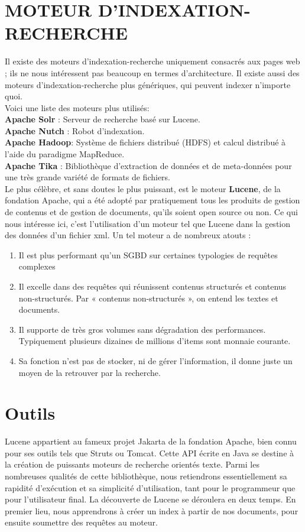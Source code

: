 \documentclass[12pt]{report}
\begin{document}
\section{MOTEUR D’INDEXATION-RECHERCHE}
Il existe des moteurs d’indexation-recherche uniquement consacrés aux pages web ; ils ne nous intéressent pas beaucoup en termes d’architecture. 
Il existe aussi des moteurs d’indexation-recherche plus génériques, qui peuvent indexer n’importe quoi.\\
Voici une liste des  moteurs plus utilisés:\\
\textbf{Apache Solr} : Serveur de recherche basé sur Lucene.\\
\textbf{Apache Nutch} : Robot d'indexation.\\
\textbf{Apache Hadoop}: Système de fichiers distribué (HDFS) et calcul distribué à l'aide du paradigme MapReduce.\\
\textbf{Apache Tika} : Bibliothèque d'extraction de données et de meta-données pour une très grande variété de formats de fichiers.\\
Le plus célèbre, et sans doutes le plus puissant, est le moteur \textbf{Lucene}, de la fondation Apache, qui a été adopté par pratiquement tous les produits de gestion de contenus et de gestion de documents, qu’ils soient open source ou non. 
Ce qui nous intéresse ici, c’est l’utilisation d’un moteur tel que Lucene dans la gestion des données d'un fichier xml. Un tel moteur a de nombreux atouts :
\begin{enumerate}
\item
Il est plus performant qu’un SGBD sur certaines typologies de requêtes complexes 
\item
Il excelle dans des requêtes qui réunissent contenus structurés et contenus non-structurés. Par « contenus non-structurés », on entend les textes et documents.
\item
Il supporte de très gros volumes sans dégradation des performances. Typiquement plusieurs dizaines de millions d’items sont monnaie courante.
\item
Sa fonction n’est pas de stocker, ni de gérer l’information, il donne juste un moyen de la retrouver par la recherche.

\end{enumerate}
\newpage
\section{Outils}
Lucene appartient au fameux projet Jakarta de la fondation Apache, bien connu pour ses outils tels que Struts ou Tomcat. Cette API écrite en Java se destine à la création de puissants moteurs de recherche orientés texte. Parmi les nombreuses qualités de cette bibliothèque, nous retiendrons essentiellement sa rapidité d'exécution et sa simplicité d'utilisation, tant pour le programmeur que pour l'utilisateur final. La découverte de Lucene se déroulera en deux temps. En premier lieu, nous apprendrons à créer un index à partir de nos documents, pour ensuite soumettre des requêtes au moteur. 
\end{document}
